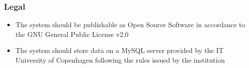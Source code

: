 \subsubsection{Legal}

\begin{itemize}
\item The system should be publishable as Open Source Software in accordance to the GNU General Public License v2.0
\item The system should store data on a MySQL server provided by the IT University of Copenhagen following the rules issued by the institution
\end{itemize}

